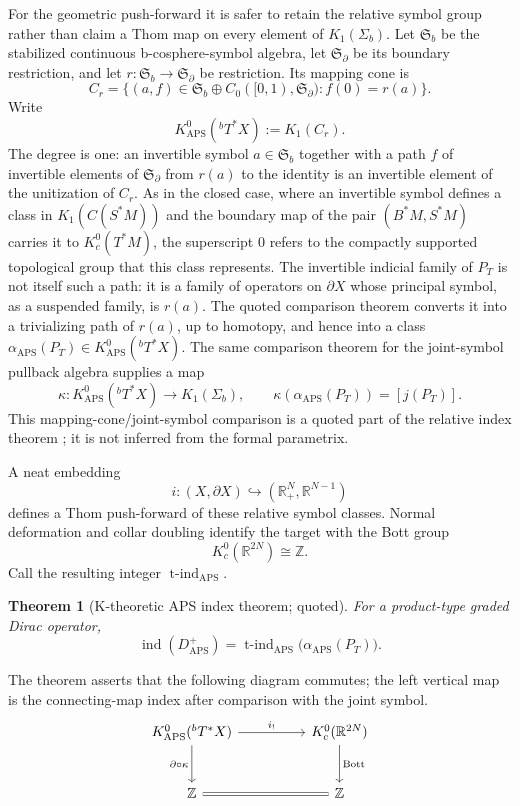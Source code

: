 \documentclass[12pt,oneside,reqno]{article}
\theoremstyle{plain}
\newtheorem{theorem}{Theorem}[section]
\theoremstyle{definition}
\theoremstyle{remark}
\begin{document}
For the geometric push-forward it is safer to retain the relative symbol
group rather than claim a Thom map on every element of \(K_1(\Sigma_b)\).
Let \(\mathfrak S_b\) be the stabilized continuous b-cosphere-symbol
algebra, let \(\mathfrak S_\partial\) be its boundary restriction, and let
\(r:\mathfrak S_b\to\mathfrak S_\partial\) be restriction. Its mapping
cone is
\[
 C_r=\{(a,f)\in\mathfrak S_b\oplus
 C_0([0,1),\mathfrak S_\partial): f(0)=r(a)\}.
\]
Write
\[
 K^0_{\mathrm{APS}}({}^bT^*X):=K_1(C_r).
\]
The degree is one: an invertible symbol \(a\in\mathfrak S_b\) together with
a path \(f\) of invertible elements of \(\mathfrak S_\partial\) from
\(r(a)\) to the identity is an invertible element of the unitization of
\(C_r\). As in the closed case, where an invertible symbol defines a class
in \(K_1(C(S^*M))\) and the boundary map of the pair \((B^*M,S^*M)\) carries
it to \(K^0_c(T^*M)\), the superscript \(0\) refers to the compactly
supported topological group that this class represents. The invertible
indicial family of \(P_T\) is not itself such a path: it is a family of
operators on \(\partial X\) whose principal symbol, as a suspended family,
is \(r(a)\). The quoted comparison theorem converts it into a trivializing
path of \(r(a)\), up to homotopy, and hence into a class
\(\alpha_{\mathrm{APS}}(P_T)\in K^0_{\mathrm{APS}}({}^bT^*X)\).
The same comparison theorem for the joint-symbol pullback algebra supplies
a map
\[
 \kappa:K^0_{\mathrm{APS}}({}^bT^*X)\longrightarrow K_1(\Sigma_b),
 \qquad
 \kappa(\alpha_{\mathrm{APS}}(P_T))=[j(P_T)].
\]
This mapping-cone/joint-symbol comparison is a quoted part of the relative
index theorem \cite{MelrosePiazza}; it is not inferred from the formal
parametrix.

A neat embedding
\[
 i:(X,\partial X)\hookrightarrow
 (\mathbb R_+^N,\mathbb R^{N-1})
\]
defines a Thom push-forward of these relative symbol classes. Normal deformation
and collar doubling identify the target with the Bott group
\[
 K_c^0(\mathbb R^{2N})\cong\mathbb Z.
\]
Call the resulting integer
\(\operatorname{t\text{-}ind}_{\mathrm{APS}}\).

\begin{theorem}[K-theoretic APS index theorem; quoted]
For a product-type graded Dirac operator,
\[
 \operatorname{ind}(D^+_{\mathrm{APS}})
 =
 \operatorname{t\text{-}ind}_{\mathrm{APS}}
 \bigl(\alpha_{\mathrm{APS}}(P_T)\bigr).
\]
\end{theorem}

The theorem asserts that the following diagram commutes; the left vertical
map is the connecting-map index after comparison with the joint symbol.
\[
\begin{tikzcd}[column sep=huge,row sep=large]
 K^0_{\mathrm{APS}}({}^bT^*X)
 \arrow[r,"i_!"]
 \arrow[d,"{\partial\circ\kappa}"']
 &K_c^0(\mathbb R^{2N})
 \arrow[d,"\mathrm{Bott}"]\\
 \mathbb Z\arrow[r,equal]&\mathbb Z
\end{tikzcd}
\]
\end{document}
